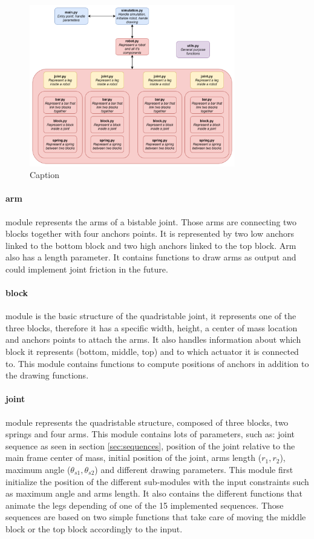         \begin{figure}
            \centering
            \includegraphics[width=0.8\textwidth]{images/code_structure.png}
            \caption{Caption}
            \label{fig:code_structure}
        \end{figure}
        
        \paragraph{arm}
            module represents the arms of a bistable joint. Those arms are connecting two blocks together with four anchors points. It is represented by two low anchors linked to the bottom block and two high anchors linked to the top block. Arm also has a length parameter. It contains functions to draw arms as output and could implement joint friction in the future. 
        \paragraph{block}
            module is the basic structure of the quadristable joint, it represents one of the three blocks, therefore it has a specific width, height, a center of mass location and anchors points to attach the arms. It also handles information about which block it represents (bottom, middle, top) and to which actuator it is connected to. This module contains functions to compute positions of anchors in addition to the drawing functions.
        \paragraph{joint}
            module represents the quadristable structure, composed of three blocks, two springs and four arms. This module contains lots of parameters, such as: joint sequence as seen in section \ref{sec:sequences}, position of the joint relative to the main frame center of mass, initial position of the joint, arms length ($r_1, r_2$), maximum angle ($\theta_{s1}, \theta_{s2}$) and different drawing parameters. This module first initialize the position of the different sub-modules with the input constraints such as maximum angle and arms length. It also contains the different functions that animate the legs depending of one of the 15 implemented sequences. Those sequences are based on two simple functions that take care of moving the middle block or the top block accordingly to the input.
